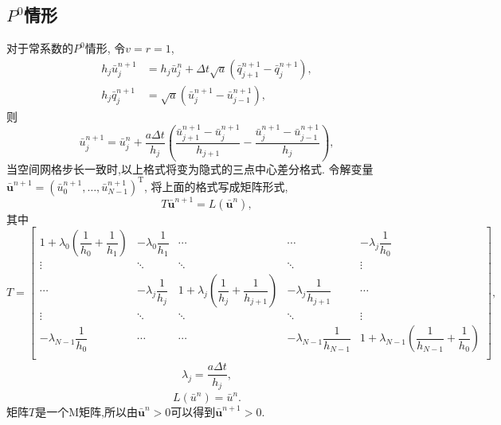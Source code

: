 \documentclass[a4paper, 11pt]{ctexart}
\numberwithin{equation}{section}
\numberwithin{figure}{section}
\newcommand\bu{\bm{u}}
\newcommand\doh[1]{\dfrac{1}{h_{#1}}}
\begin{document}
\subsection{$P^0$情形}
对于常系数的$P^0$情形,
令$v=r=1$,
\begin{align}
  h_j\bar{u}^{n+1}_j&=h_j\bar{u}^{n}_j+\Delta t\sqrt{a}(\bar{q}^{n+1}_{j+1}
  -\bar{q}^{n+1}_{j}), \\
  h_j\bar{q}^{n+1}_j&=\sqrt{a}(\bar{u}^{n+1}_j-\bar{u}^{n+1}_{j-1}),
\end{align}
则\begin{equation}
  \bar{u}^{n+1}_j=\bar{u}^{n}_j+\dfrac{a\Delta t}{h_j}
  (\dfrac{\bar{u}^{n+1}_{j+1}-\bar{u}^{n+1}_{j}}{h_{j+1}}-\dfrac{\bar{u}^{n+1}_{j}-\bar{u}^{n+1}_{j-1}}{h_j}),
\end{equation}
当空间网格步长一致时,以上格式将变为隐式的三点中心差分格式.
令解变量
$\bar{\bu}^{n+1}=(\bar{u}_0^{n+1},\dots,\bar{u}_{N-1}^{n+1})^\mathrm{T}$,
将上面的格式写成矩阵形式,
\begin{equation}
  T\bar{\bu}^{n+1}=L(\bar{\bu}^{n}),
\end{equation}
其中
\begin{equation}
  T=\begin{bmatrix}
    1+\lambda_0(\doh{0}+\doh{1}) & -\lambda_0\doh{1} & \cdots & \cdots & -\lambda_j\doh{0} \\
    \vdots & \ddots  & \ddots  & \ddots  & \vdots \\
    \cdots & -\lambda_j\doh{j} & 1+\lambda_j(\doh{j}+\doh{j+1}) & -\lambda_j\doh{j+1} & \cdots \\
    \vdots & \ddots  & \ddots  & \ddots  & \vdots \\
    -\lambda_{N-1}\doh{0} & \cdots & \cdots & -\lambda_{N-1}\doh{N-1} & 1+\lambda_{N-1}(\doh{N-1}+\doh{0}) \\
  \end{bmatrix},
\end{equation}
\begin{align}
  \lambda_j=\dfrac{a\Delta t}{h_j},
\end{align}
\begin{equation}
  L(\bar{u}^{n}) =\bar{u}^{n}.
\end{equation}
矩阵$T$是一个M矩阵,所以由$\bar{\bu}^n>0$可以得到$\bar{\bu}^{n+1}>0$.
\end{document}
